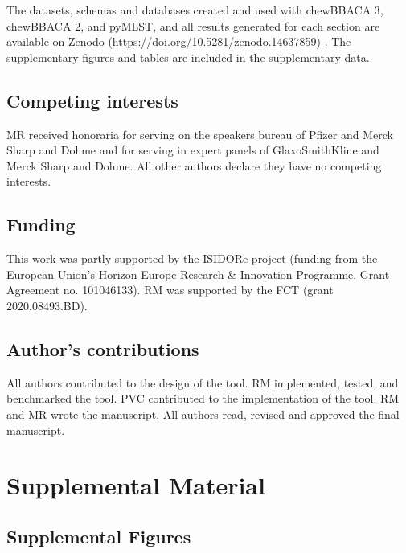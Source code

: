The datasets, schemas and databases created and used with chewBBACA 3, chewBBACA 2, and pyMLST, and all results generated for each section are available on Zenodo (\url{https://doi.org/10.5281/zenodo.14637859}) \citep{mamede_supplementary_2025}. The supplementary figures and tables are included in the supplementary data.

\subsection{Competing interests} \label{ssec:ch2_declarations_ssec4}

MR received honoraria for serving on the speakers bureau of Pfizer and Merck Sharp and Dohme and for serving in expert panels of GlaxoSmithKline and Merck Sharp and Dohme. All other authors declare they have no competing interests.

\subsection{Funding} \label{ssec:ch2_declarations_ssec5}

This work was partly supported by the ISIDORe project (funding from the European Union’s Horizon Europe Research \& Innovation Programme, Grant Agreement no. 101046133). RM was supported by the \ac{FCT} (grant 2020.08493.BD).

\subsection{Author’s contributions} \label{ssec:ch2_declarations_ssec6}

All authors contributed to the design of the tool. RM implemented, tested, and benchmarked the tool. PVC contributed to the implementation of the tool. RM and MR wrote the manuscript. All authors read, revised and approved the final manuscript.

\newpage

\section{Supplemental Material} \label{sec:ch2_supplemental_material}

\subsection{Supplemental Figures} \label{ssec:ch2_supplemental_figures}

